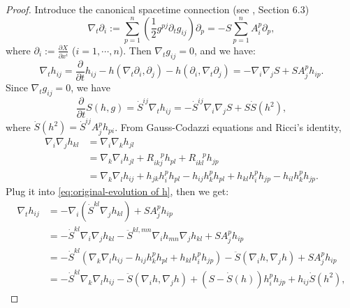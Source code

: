 \documentclass[10pt,a4paper]{amsart}
\newcommand{\pd}[2]{\frac{\partial {#1}}{\partial {#2}}}
\numberwithin{equation}{section}
\begin{document}
\begin{proof}
Introduce the canonical spacetime connection  (see \cite{Andrews-Ben-The-Ricci-Flow}, Section 6.3)
\begin{equation}\label{eq:canonical-spacetime-connection}
    \nabla_t \partial_i:= \sum_{p=1}^{n}\left(\frac{1}{2}g^{pj}\partial_t g_{ij}\right)\partial_p = -S\sum_{p=1}^{n}A_i^p \partial_p,
\end{equation}
where \(\partial_i := \pd{X}{x^i}\) (\(i=1,\cdots,n\)). Then \(\nabla_t g_{ij} = 0\), and we have:
\begin{equation}\label{eq:original-evolution of h}
    \nabla_t h_{ij} = \pd{}{t}h_{ij} - h(\nabla_t \partial_i,\partial_j) - h(\partial_i, \nabla_t \partial_j) = -\nabla_i\nabla_j S + SA_j^p h_{ip}.
\end{equation}
Since $\nabla_t g_{ij} = 0$, we have 
\begin{equation}\label{eq:original-evolution of S}
    \pd{}{t}S(h,g) = \dot{S}^{ij}\nabla_t h_{ij} = -\dot{S}^{ij}\nabla_i\nabla_j S + S\dot{S}(h^2),
\end{equation}
where \(\dot{S}(h^2) = \dot{S}^{ij}A_j^p h_{pi}\).
From Gauss-Codazzi equations and Ricci's identity,
\begin{equation}
    \begin{aligned}
        \nabla_i \nabla_j h_{kl} &= \nabla_i \nabla_k h_{jl} \\
        &= \nabla_k \nabla_i h_{jl} + R_{ikj}^{\quad p} h_{pl} + R_{ikl}^{\quad p} h_{jp} \\
        &= \nabla_k \nabla_l h_{ij} + h_{jk}h_i^p h_{pl} - h_{ij}h_k^p h_{pl} + h_{kl}h_i^p h_{jp} - h_{il}h_k^p h_{jp}.
    \end{aligned}
\end{equation}
Plug it into \eqref{eq:original-evolution of h}, then we get:
\begin{equation}
    \begin{aligned}\label{eq:eoh}
        \nabla_t h_{ij}&= -\nabla_i(\dot{S}^{kl}\nabla_j h_{kl}) + SA_j^p h_{ip} \\
        &= -\dot{S}^{kl}\nabla_i\nabla_j h_{kl} - \ddot{S}^{kl,mn}\nabla_i h_{mn}\nabla_j h_{kl} + SA_j^p h_{ip} \\
        &= -\dot{S}^{kl}(\nabla_k \nabla_l h_{ij} - h_{ij}h_k^p h_{pl} + h_{kl}h_i^p h_{jp}) - \ddot{S}(\nabla_i h, \nabla_j h) + SA_j^p h_{ip} \\
        &= -\dot{S}^{kl}\nabla_k \nabla_l h_{ij} - \ddot{S}(\nabla_i h, \nabla_j h) + (S - \dot{S}(h))h_i^p h_{jp} + h_{ij}\dot{S}(h^2),
    \end{aligned}

\end{equation}
\end{proof}
\end{document}
